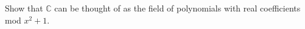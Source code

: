 Show that $\mathbb{C}$ can be thought of as the field of polynomials with real coefficients mod
$x^2+1$.\\

\begin{solution}\renewcommand{\qedsymbol}{}\ \\

    

\end{solution}
